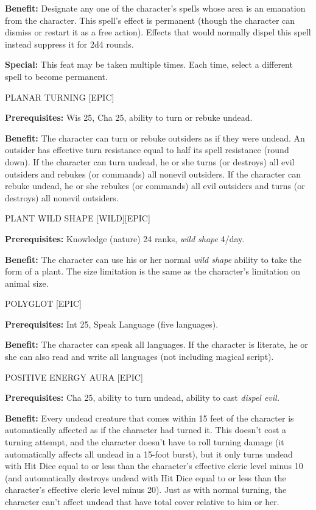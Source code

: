 \documentclass{article}
\begin{document}
\textbf{Benefit:} Designate any one of the character's spells whose area is an 
emanation from the character. This spell's effect is permanent (though the character 
can dismiss or restart it as a free action). Effects that would normally dispel 
this spell instead suppress it for 2d4 rounds. 

\textbf{Special:} This feat may be taken multiple times. Each time, select a different 
spell to become permanent. 

\vspace{12pt}
PLANAR TURNING [EPIC] 

\textbf{Prerequisites:} Wis 25, Cha 25, ability to turn or rebuke undead. 

\textbf{Benefit:} The character can turn or rebuke outsiders as if they were undead. 
An outsider has effective turn resistance equal to half its spell resistance (round 
down). If the character can turn undead, he or she turns (or destroys) all evil 
outsiders and rebukes (or commands) all nonevil outsiders. If the character can 
rebuke undead, he or she rebukes (or commands) all evil outsiders and turns (or 
destroys) all nonevil outsiders. 

\vspace{12pt}
PLANT WILD SHAPE [WILD][EPIC]

\textbf{Prerequisites:} Knowledge (nature) 24 ranks, \textit{wild shape }4/day. 

\textbf{Benefit:} The character can use his or her normal \textit{wild shape }ability 
to take the form of a plant. The size limitation is the same as the character's 
limitation on animal size. 

\vspace{12pt}
POLYGLOT [EPIC] 

\textbf{Prerequisites:} Int 25, Speak Language (five languages). 

\textbf{Benefit:} The character can speak all languages. If the character is literate, 
he or she can also read and write all languages (not including magical script). 

\vspace{12pt}
POSITIVE ENERGY AURA [EPIC] 

\textbf{Prerequisites:} Cha 25, ability to turn undead, ability to cast \textit{dispel 
evil. }

\textbf{Benefit:} Every undead creature that comes within 15 feet of the character 
is automatically affected as if the character had turned it. This doesn't cost 
a turning attempt, and the character doesn't have to roll turning damage (it automatically 
affects all undead in a 15-foot burst), but it only turns undead with Hit Dice 
equal to or less than the character's effective cleric level minus 10 (and automatically 
destroys undead with Hit Dice equal to or less than the character's effective cleric 
level minus 20). Just as with normal turning, the character can't affect undead 
that have total cover relative to him or her. 
\end{document}
